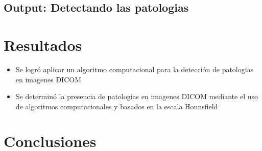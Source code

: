 \documentclass{article}
\begin{document}
\subsection{Output: Detectando las patologias}




	\section{Resultados}
	\begin{itemize}
		\item Se logró aplicar  un algoritmo computacional para la detección de patologias en imagenes DICOM
		\item Se determinó la presencia de patologias en imagenes DICOM mediante el uso de algoritmos computacionales y basados en la escala Hounsfield
		\end{itemize}
		


	\section{Conclusiones}


	
	
\end{document}
